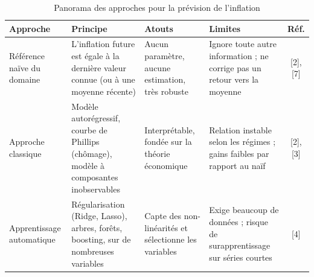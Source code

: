 \documentclass[11pt,a4paper]{article}
\begin{document}
\begin{table}[H]\centering\small
\caption{Panorama des approches pour la prévision de l'inflation}\label{tab:etat}
\begin{tabular}{@{}p{2.5cm}p{3.5cm}p{3.2cm}p{3.6cm}c@{}}
\toprule
Approche & Principe & Atouts & Limites & Réf.\\\midrule
Référence naïve du domaine & L'inflation future est égale à la dernière valeur connue (ou à une moyenne récente) & Aucun paramètre, aucune estimation, très robuste & Ignore toute autre information ; ne corrige pas un retour vers la moyenne & [2], [7]\\
Approche classique & Modèle autorégressif, courbe de Phillips (chômage), modèle à composantes inobservables & Interprétable, fondée sur la théorie économique & Relation instable selon les régimes ; gains faibles par rapport au naïf & [2], [3]\\
Apprentissage automatique & Régularisation (Ridge, Lasso), arbres, forêts, boosting, sur de nombreuses variables & Capte des non-linéarités et sélectionne les variables & Exige beaucoup de données ; risque de surapprentissage sur séries courtes & [4]\\
\bottomrule
\end{tabular}
\end{table}

\end{document}
